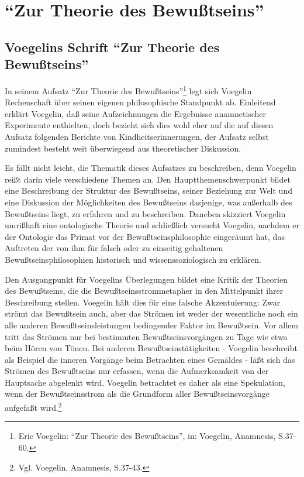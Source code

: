


\section{"`Zur Theorie des Bewußtseins"'}

\subsection{Voegelins Schrift "`Zur Theorie des Bewußtseins"'}

In seinem Aufsatz "`Zur Theorie des Bewußtseins"'\footnote{Eric Voegelin:
  "`Zur Theorie des Bewußtseins"', in: Voegelin, Anamnesis, S.37-60.} legt
sich Voegelin Rechenschaft über seinen eigenen philosophische Standpunkt ab.
Einleitend erklärt Voegelin, daß seine Aufzeichnungen die Ergebnisse
anamnetischer Experimente enthielten, doch bezieht sich dies wohl eher auf die
auf diesen Aufsatz folgenden Berichte von Kindheitserinnerungen, der Aufsatz
selbst zumindest besteht weit überwiegend aus theoretischer Diskussion.

Es fällt nicht leicht, die Thematik dieses Aufsatzes zu beschreiben,
denn Voegelin reißt darin viele verschiedene Themen an. Den
Hauptthemenschwerpunkt bildet eine Beschreibung der Struktur des
Bewußtseins, seiner Beziehung zur Welt und eine Diskussion der
Möglichkeiten des Bewußtseins dasjenige, was außerhalb des Bewußtseins
liegt, zu erfahren und zu beschreiben. Daneben skizziert Voegelin
umrißhaft eine ontologische Theorie und schließlich versucht Voegelin,
nachdem er der Ontologie das Primat vor der Bewußtseinsphilosophie
eingeräumt hat, das Auftreten der von ihm für falsch oder zu einseitig
gehaltenen Bewußtseinsphilosophien historisch und wissenssoziologisch zu
erklären.

Den Ausgangpunkt für Voegelins Überlegungen bildet eine Kritik der Theorien
des Bewußtseins, die die Bewußtseinsstrommetapher in den Mittelpunkt ihrer
Beschreibung stellen. Voegelin hält dies für eine falsche Akzentuierung: Zwar
strömt das Bewußtsein auch, aber das Strömen ist weder der wesentliche noch
ein alle anderen Bewußtseinsleistungen bedingender Faktor im Bewußtsein. Vor
allem tritt das Strömen nur bei bestimmten Bewußtseinsvorgängen zu Tage wie
etwa beim Hören von Tönen. Bei anderen Bewußtseinstätigkeiten - Voegelin
beschreibt als Beispiel die inneren Vorgänge beim Betrachten eines Gemäldes -
läßt sich das Strömen des Bewußtseins nur erfassen, wenn die Aufmerksamkeit
von der Hauptsache abgelenkt wird. Voegelin betrachtet es daher als eine
Spekulation, wenn der Bewußtseinsstrom als die Grundform aller
Bewußtseinsvorgänge aufgefaßt wird.\footnote{Vgl. Voegelin, Anamnesis,
  S.37-43.}

